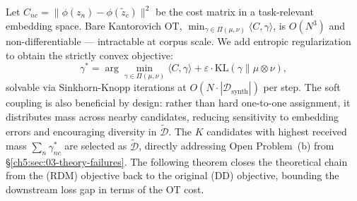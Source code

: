 \begin{foldable} %
	Let $C_{nc} = \|\phi(z_n) - \phi(\tilde{z}_c)\|^2$ be the cost matrix in a task-relevant embedding space.
	Bare Kantorovich OT, $\min_{\gamma \in \Pi(\mu,\nu)} \langle C, \gamma \rangle$, is $O(N^3)$ and non-differentiable --- intractable at corpus scale.
	We add entropic regularization to obtain the strictly convex objective:
	\begin{equation}
		\gamma^* = \arg\min_{\gamma \in \Pi(\mu,\nu)} \langle C, \gamma \rangle + \varepsilon \cdot \mathrm{KL}(\gamma \| \mu \otimes \nu),
		\label{ch5:eq:ot}
	\end{equation}
	solvable via Sinkhorn-Knopp iterations at $O(N \cdot |\mathcal{D}_\text{synth}|)$ per step.
	The soft coupling is also beneficial by design: rather than hard one-to-one assignment, it distributes mass across nearby candidates, reducing sensitivity to embedding errors and encouraging diversity in $\tilde{\mathcal{D}}$.
	The $K$ candidates with highest received mass $\sum_n \gamma^*_{nc}$ are selected as $\tilde{\mathcal{D}}$, directly addressing Open Problem~(b) from \S\ref{ch5:sec:03-theory-failures}.
	The following theorem closes the theoretical chain from the (RDM) objective back to the original (DD) objective, bounding the downstream loss gap in terms of the OT cost.


\end{foldable}
